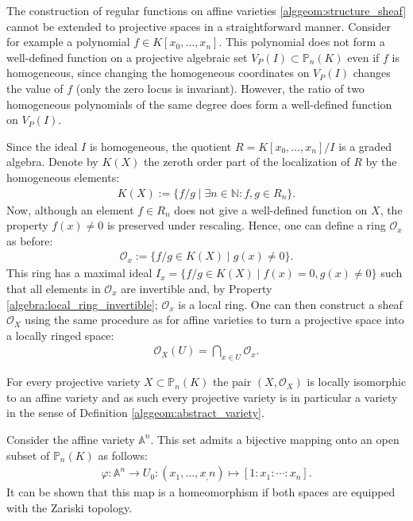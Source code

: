     The construction of regular functions on affine varieties \ref{alggeom:structure_sheaf} cannot be extended to projective spaces in a straightforward manner. Consider for example a polynomial $f\in K[x_0,\ldots,x_n]$. This polynomial does not form a well-defined function on a projective algebraic set $V_P(I)\subset\mathbb{P}_n(K)$ even if $f$ is homogeneous, since changing the homogeneous coordinates on $V_P(I)$ changes the value of $f$ (only the zero locus is invariant). However, the ratio of two homogeneous polynomials of the same degree does form a well-defined function on $V_P(I)$.

    Since the ideal $I$ is homogeneous, the quotient $R=K[x_0,\ldots,x_n]/I$ is a graded algebra. Denote by $K(X)$ the zeroth order part of the localization of $R$ by the homogeneous elements:
    \begin{gather}
        K(X) := \{f/g\mid\exists n\in\mathbb{N}:f,g\in R_n\}.
    \end{gather}
    Now, although an element $f\in R_n$ does not give a well-defined function on $X$, the property $f(x)\neq0$ is preserved under rescaling. Hence, one can define a ring $\mathcal{O}_x$ as before:
    \begin{gather}
        \mathcal{O}_x := \{f/g\in K(X)\mid g(x)\neq 0\}.
    \end{gather}
    This ring has a maximal ideal $I_x = \{f/g\in K(X)\mid f(x)=0,g(x)\neq 0\}$ such that all elements in $\mathcal{O}_x$ are invertible and, by Property \ref{algebra:local_ring_invertible}; $\mathcal{O}_x$ is a local ring. One can then construct a sheaf $\mathcal{O}_X$ using the same procedure as for affine varieties to turn a projective space into a locally ringed space:
    \begin{gather}
        \mathcal{O}_X(U) = \bigcap_{x\in U}\mathcal{O}_x.
    \end{gather}

    \begin{property}[Variety]
        For every projective variety $X\subset\mathbb{P}_n(K)$ the pair $(X, \mathcal{O}_X)$ is locally isomorphic to an affine variety and as such every projective variety is in particular a variety in the sense of Definition \ref{alggeom:abstract_variety}.
    \end{property}
    \begin{property}
        Consider the affine variety $\mathbb{A}^n$. This set admits a bijective mapping onto an open subset of $\mathbb{P}_n(K)$ as follows:
        \begin{gather}
            \varphi:\mathbb{A}^n\rightarrow U_0:(x_1,\ldots,x_,n)\mapsto[1:x_1:\cdots:x_n].
        \end{gather}
        It can be shown that this map is a homeomorphism if both spaces are equipped with the Zariski topology.
    \end{property}

